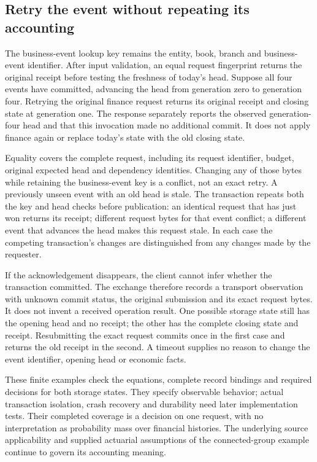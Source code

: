 \subsection*{Retry the event without repeating its accounting}

The business-event lookup key remains the entity, book, branch and
business-event identifier. After input validation, an equal request
fingerprint returns the original receipt before testing the freshness of
today's head. Suppose all four events have committed, advancing the head
from generation zero to generation four. Retrying the original finance
request returns its original receipt and closing state at generation one.
The response separately reports the observed generation-four head and that
this invocation made no additional commit. It does not apply finance again
or replace today's state with the old closing state.

Equality covers the complete request, including its request identifier,
budget, original expected head and dependency identities. Changing any of
those bytes while retaining the business-event key is a conflict, not an
exact retry. A previously unseen event with an old head is stale. The
transaction repeats both the key and head checks before publication: an
identical request that has just won returns its receipt; different request
bytes for that event conflict; a different event that advances the head
makes this request stale. In each case the competing transaction's changes
are distinguished from any changes made by the requester.

If the acknowledgement disappears, the client cannot infer whether the
transaction committed. The exchange therefore records a transport
observation with unknown commit status, the original submission and its
exact request bytes. It does not invent a received operation result. One
possible storage state still has the opening head and no receipt; the other
has the complete closing state and receipt. Resubmitting the exact request
commits once in the first case and returns the old receipt in the second.
A timeout supplies no reason to change the event identifier, opening head
or economic facts.

These finite examples check the equations, complete record bindings and
required decisions for both storage states. They specify observable
behavior; actual transaction isolation, crash recovery and durability need
later implementation tests. Their completed coverage is a decision on one
request, with no interpretation as probability mass over financial histories.
The underlying source applicability and supplied actuarial assumptions of
the connected-group example continue to govern its accounting meaning.
